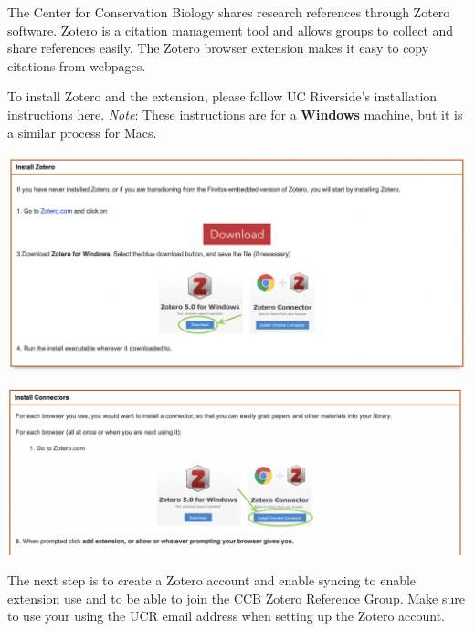 \documentclass[
]{book}
\begin{document}
The Center for Conservation Biology shares research references through Zotero software. Zotero is a citation management tool and allows groups to collect and share references easily. The Zotero browser extension makes it easy to copy citations from webpages.

To install Zotero and the extension, please follow UC Riverside's installation instructions \href{https://guides.lib.ucr.edu/c.php?g=171064}{here}. \emph{Note}: These instructions are for a \textbf{Windows} machine, but it is a similar process for Macs.

\begin{center}\includegraphics[width=24.56in]{images/zoteroinstall} \end{center}

\begin{center}\includegraphics[width=24.64in]{images/zoteroextension} \end{center}

The next step is to create a Zotero account and enable syncing to enable extension use and to be able to join the \href{https://www.zotero.org/groups/4734848/ccbucr}{CCB Zotero Reference Group}. Make sure to use your using the UCR email address when setting up the Zotero account.
\end{document}

